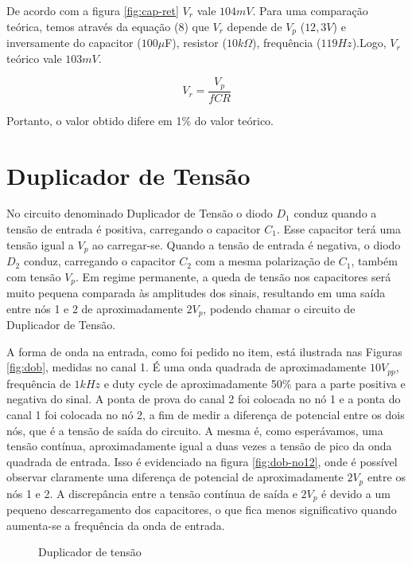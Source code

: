\documentclass[a4paper]{article} %
\renewcommand{\thefigure}{\thesection.\arabic{figure}}
\begin{document}
De acordo com a figura \ref{fig:cap-ret} $V_r$ vale $104mV$. Para uma comparação teórica, temos através da equação (8) que $V_r$ depende de $V_p$ ($12,3V$) e inversamente do capacitor ($100\mu$F), resistor ($10k\Omega$), frequência ($119Hz$).Logo, $V_r$ teórico vale $103mV$.  

\begin{equation}
V_r = \frac{V_p} {fCR}
\end{equation}

Portanto, o valor obtido difere em 1\% do valor teórico.

\renewcommand{\thefigure}{\thesection.\arabic{figure}}

\section{Duplicador de Tensão}

No circuito denominado Duplicador de Tensão o diodo $D_1$ conduz quando a tensão de entrada é positiva, carregando o capacitor $C_1$. Esse capacitor terá uma tensão igual a $V_p$ ao carregar-se. Quando a tensão de entrada é negativa, o diodo $D_2$ conduz, carregando o capacitor $C_2$ com a mesma polarização de $C_1$, também com tensão $V_p$. Em regime permanente, a queda de tensão nos capacitores será muito pequena comparada às amplitudes dos sinais, resultando em uma saída entre nós 1 e 2 de aproximadamente $2V_p$, podendo chamar o circuito de Duplicador de Tensão.

A forma de onda na entrada, como foi pedido no item, está ilustrada nas Figuras \ref{fig:dob}, medidas no canal 1.
É uma onda quadrada de aproximadamente $10 V_{pp}$, frequência de $1kHz$ e duty cycle de aproximadamente
50\% para a parte positiva e negativa do sinal. A ponta de prova do canal 2 foi colocada no nó 1 e a ponta do canal 1 foi colocada no nó 2, a fim de medir
a diferença de potencial entre os dois nós, que é a tensão de saída do circuito. A
mesma é, como esperávamos, uma tensão contínua, aproximadamente igual a
duas vezes a tensão de pico da onda quadrada de entrada.
Isso é evidenciado na figura \ref{fig:dob-no12}, onde é possível observar claramente uma diferença de potencial de aproximadamente $2V_p$ entre os nós 1 e 2. A discrepância entre a tensão contínua de saída e $2V_p$ é devido a um pequeno descarregamento dos capacitores, o que fica menos significativo quando aumenta-se a frequência da onda de entrada.



 \setcounter{figure}{0}
\vspace{3mm}
\begin{figure}[h]
\centerline{}
\caption{Duplicador de tensão \label{tab:circ}}
\end{figure}
\end{document}
